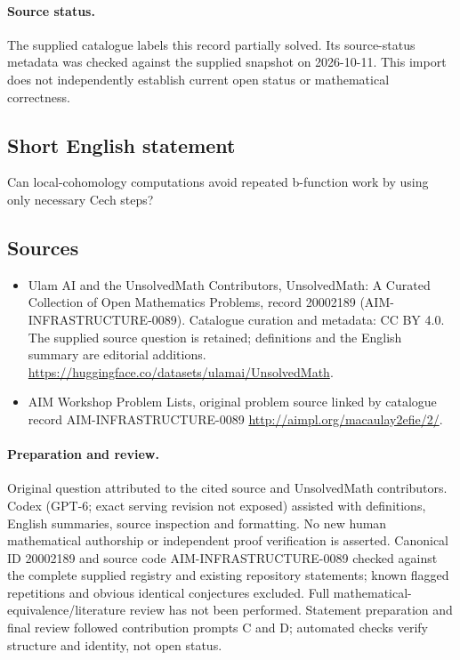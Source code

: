\documentclass[11pt]{article}
\begin{document}
\paragraph{Source status.}
The supplied catalogue labels this record partially solved. Its source-status metadata was checked against the supplied snapshot on 2026-10-11. This import does not independently establish current open status or mathematical correctness.
\subsection{Short English statement}
Can local-cohomology computations avoid repeated b-function work by using only necessary Cech steps?
\subsection{Sources}
\begin{itemize}
\item[\hypertarget{source:20002189:1}{S1}] Ulam AI and the UnsolvedMath Contributors, UnsolvedMath: A Curated Collection of Open Mathematics Problems, record 20002189 (AIM-INFRASTRUCTURE-0089). Catalogue curation and metadata: CC BY 4.0. The supplied source question is retained; definitions and the English summary are editorial additions.
\url{https://huggingface.co/datasets/ulamai/UnsolvedMath}.
\item[\hypertarget{source:20002189:2}{S2}] AIM Workshop Problem Lists, original problem source linked by catalogue record AIM-INFRASTRUCTURE-0089
\url{http://aimpl.org/macaulay2efie/2/}.
\end{itemize}
\paragraph{Preparation and review.}
Original question attributed to the cited source and UnsolvedMath contributors. Codex (GPT-6; exact serving revision not exposed) assisted with definitions, English summaries, source inspection and formatting. No new human mathematical authorship or independent proof verification is asserted. Canonical ID 20002189 and source code AIM-INFRASTRUCTURE-0089 checked against the complete supplied registry and existing repository statements; known flagged repetitions and obvious identical conjectures excluded. Full mathematical-equivalence/literature review has not been performed. Statement preparation and final review followed contribution prompts C and D; automated checks verify structure and identity, not open status.
\label{end:20002189}
\end{document}
